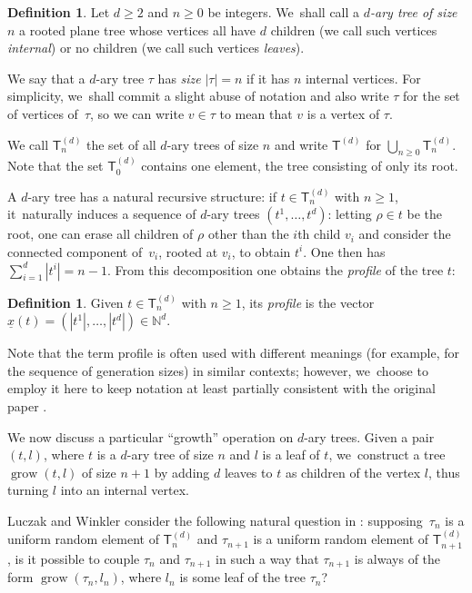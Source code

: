 \documentclass[JEP,XML,SOM,Unicode,NoFloatCountersInSection, NoEqCountersInSection,published]{cedram}
\newcommand{\sT}{\mathsf{T}}
\newcommand{\grow}{\operatorname{grow}}
\theoremstyle{definition}
\newtheorem{defn}[thm]{Definition}
\begin{document}

\begin{defn}\label{def:complete d-ary tree}
Let $d\!\geq\! 2$ and $n\!\geq\! 0$ be integers. We~shall call a \emph{$d$-ary tree of size~$n$} a rooted plane tree whose vertices all have $d$ children (we call such vertices \emph{internal}) or no children (we call such vertices \emph{leaves}).

We say that a $d$-ary tree $\tau$ has \emph{size} $|\tau|=n$ if it has $n$ internal vertices. For simplicity, we~shall commit a slight abuse of notation and also write $\tau$ for the set of vertices of~$\tau$, so we can write $v\in \tau$ to mean that $v$ is a vertex of $\tau$.

We call $\sT_n^{(d)}$ the set of all $d$-ary trees of size $n$ and write $\sT^{(d)}$ for $\bigcup_{n\geq 0}\sT_n^{(d)}$. Note that the set $\sT^{(d)}_0$ contains one element, the tree consisting of only its root.
\end{defn}

A $d$-ary tree has a natural recursive structure: if $t\in\sT_n^{(d)}$ with $n\geq 1$, it~naturally induces a sequence of $d$-ary trees $(t^1,\ldots, t^d)$: letting $\rho\in t$ be the root, one can erase all children of $\rho$ other than the $i$th child $v_i$ and consider the connected component of~$v_i$, rooted at $v_i$, to obtain $t^i$. One then has $\sum_{i=1}^d|t^i|=n-1$. From this decomposition one obtains the \emph{profile} of the tree $t$:

\begin{defn}
Given $t\in \sT_n^{(d)}$ with $n\geq 1$, its \emph{profile} is the vector $\underline{x}(t)=(|t^1|,\ldots,|t^d|)\in \mathbb{N}^d$.	
\end{defn}

Note that the term profile is often used with different meanings (for example, for the sequence of generation sizes) in similar contexts; however, we~choose to employ it here to keep notation at least partially consistent with the original paper \cite{LW04}.

We now discuss a particular ``growth'' operation on $d$-ary trees. Given a pair $(t,l)$, where $t$ is a $d$-ary tree of size $n$ and $l$ is a leaf of $t$, we~construct a tree $\grow(t,l)$ of size $n+1$ by adding $d$ leaves to $t$ as children of the vertex $l$, thus turning $l$ into an internal vertex.

Luczak and Winkler consider the following natural question in \cite{LW04}: supposing~$\tau_n$ is a uniform random element of $\sT^{(d)}_n$ and $\tau_{n+1}$ is a uniform random element of $\sT^{(d)}_{n+1}$, is it possible to couple $\tau_n$ and $\tau_{n+1}$ in such a way that $\tau_{n+1}$ is always of the form $\grow(\tau_n,l_n)$, where $l_n$ is some leaf of the tree $\tau_n$?
\end{document}
